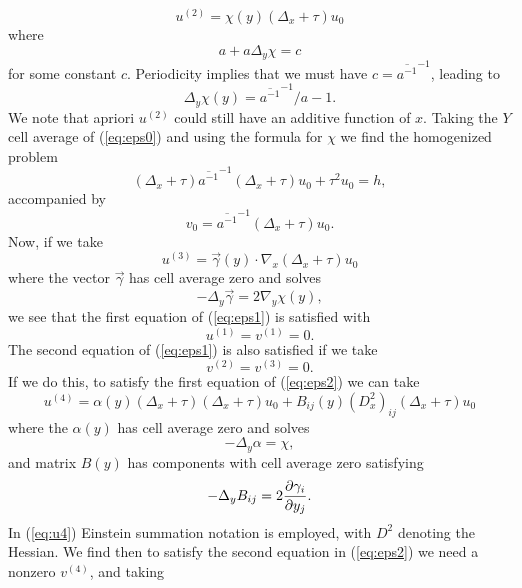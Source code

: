 \documentclass[10pt,a4paper]{amsart}
\begin{document}
\begin{equation} \label{eq:u2} u^{(2)} = \chi(y) (\Delta_x +\tau ) u_0 \end{equation}
where $$a+ a\Delta_y \chi = c$$ for some constant $c$. Periodicity implies that we must have $c =  \overline{a^{-1}}^{-1}$, leading to  
\begin{equation}\label{eq:chi} \Delta_y \chi(y) = \overline{a^{-1}}^{-1}/a -1. \end{equation}
We note that apriori $u^{(2)}$ could still have an additive function of $x$.
Taking the $Y$ cell average of (\ref{eq:eps0}) and using the formula for $\chi$ we find the homogenized problem
  \begin{equation} \label{homog2}  (\Delta_x +\tau) \overline{a^{-1}}^{-1} (\Delta_x +\tau) u_0 +\tau^2 u_0= h , \end{equation}
  accompanied by 
  \begin{equation} \label{eq:v0} v_0 = \overline{a^{-1}}^{-1}(\Delta_x +\tau) u_0.\end{equation}
Now, if we take 
\begin{equation} \label{eq:u3} u^{(3)}= \vec{\gamma}(y)\cdot \nabla_x (\Delta_x +\tau) u_0  \end{equation}
where the vector $\vec{\gamma}$ has cell average zero and solves 
\begin{equation}\label{gammaeq} -\Delta_y \vec{\gamma}  =  2\nabla_y\chi(y) , \end{equation}
we see that the first equation of (\ref{eq:eps1}) is satisfied with $$u^{(1)}=v^{(1)}=0.$$ The second equation of (\ref{eq:eps1}) is also satisfied if we take $$v^{(2)}=v^{(3)}=0.$$ If we do this, to satisfy the first equation of (\ref{eq:eps2}) we can take 
\begin{equation} \label{eq:u4} u^{(4)}= \alpha(y) (\Delta_x +\tau)  (\Delta_x +\tau) u_0  + B_{ij}(y) (D^2_x)_{ij}  (\Delta_x +\tau) u_0\end{equation}
where the $\alpha(y)$ has cell average zero and solves 
\begin{equation}\label{alphaeq} -\Delta_y  \alpha  =  \chi , \end{equation}
and matrix $B(y)$ has components with cell average zero satisfying
\begin{equation} \label{Beq} -\Delta_y B_{ij} = 2{\partial\gamma_i\over{\partial y_j}}.\end{equation}
In (\ref{eq:u4}) Einstein summation notation is employed, with $D^2$ denoting the Hessian.  We find then to satisfy the second equation in (\ref{eq:eps2}) we need a nonzero $v^{(4)}$, and taking
\end{document}
